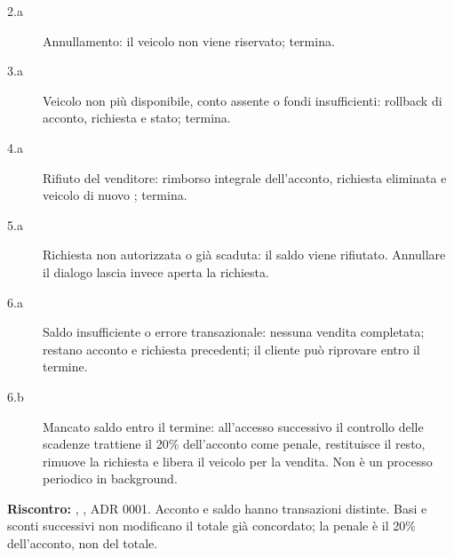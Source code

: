 \begin{description}
\item[2.a] Annullamento: il veicolo non viene riservato; termina.
\item[3.a] Veicolo non pi\`u disponibile, conto assente o fondi insufficienti:
  rollback di acconto, richiesta e stato; termina.
\item[4.a] Rifiuto del venditore: rimborso integrale dell'acconto,
  richiesta eliminata e veicolo di nuovo ; termina.
\item[5.a] Richiesta non autorizzata o gi\`a scaduta: il saldo viene rifiutato.
  Annullare il dialogo lascia invece aperta la richiesta.
\item[6.a] Saldo insufficiente o errore transazionale: nessuna vendita completata;
  restano acconto e richiesta precedenti; il cliente pu\`o riprovare entro il termine.
\item[6.b] Mancato saldo entro il termine: all'accesso successivo il controllo
  delle scadenze trattiene il 20\% dell'acconto come penale, restituisce il resto,
  rimuove la richiesta e libera il veicolo per la vendita. Non \`e un processo periodico in background.
\end{description}
\begin{flushleft}\textbf{Riscontro:} , , ADR 0001.
Acconto e saldo hanno transazioni distinte. Basi e sconti successivi non
modificano il totale gi\`a concordato; la penale \`e il 20\% dell'acconto, non del totale.\end{flushleft}


